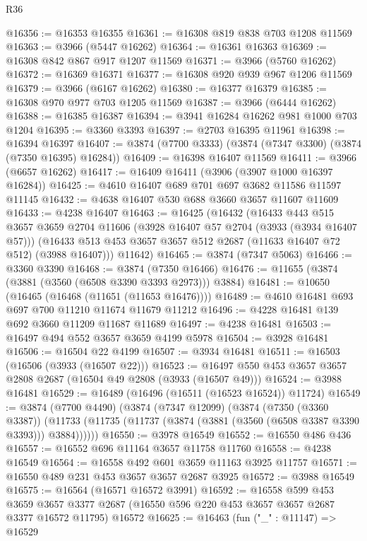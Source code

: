 \begin{lexlean}{R36}
\begin{coremodule}
@16356 := @16353 @16355
@16361 := @16308 @819 @838 @703 @1208 @11569
@16363 := @3966 (@5447 @16262)
@16364 := @16361 @16363
@16369 := @16308 @842 @867 @917 @1207 @11569
@16371 := @3966 (@5760 @16262)
@16372 := @16369 @16371
@16377 := @16308 @920 @939 @967 @1206 @11569
@16379 := @3966 (@6167 @16262)
@16380 := @16377 @16379
@16385 := @16308 @970 @977 @703 @1205 @11569
@16387 := @3966 (@6444 @16262)
@16388 := @16385 @16387
@16394 := @3941 @16284 @16262 @981 @1000 @703 @1204
@16395 := @3360 @3393
@16397 := @2703 @16395 @11961
@16398 := @16394 @16397
@16407 := @3874 (@7700 @3333) (@3874 (@7347 @3300) (@3874 (@7350 @16395) @16284))
@16409 := @16398 @16407 @11569
@16411 := @3966 (@6657 @16262)
@16417 := @16409 @16411 (@3906 (@3907 @1000 @16397 @16284))
@16425 := @4610 @16407 @689 @701 @697 @3682 @11586 @11597 @11145
@16432 := @4638 @16407 @530 @688 @3660 @3657 @11607 @11609
@16433 := @4238 @16407
@16463 := @16425
    (@16432
      (@16433
        @443
        @515
        @3657
        @3659
        @2704
        @11606
        (@3928 @16407 @57 @2704 (@3933 (@3934 @16407 @57)))
        (@16433 @513 @453 @3657 @3657 @512 @2687 (@11633 @16407 @72 @512) (@3988 @16407)))
      @11642)
@16465 := @3874 (@7347 @5063)
@16466 := @3360 @3390
@16468 := @3874 (@7350 @16466)
@16476 := @11655 (@3874 (@3881 (@3560 (@6508 @3390 @3393 @2973))) @3884)
@16481 := @10650 (@16465 (@16468 (@11651 (@11653 @16476))))
@16489 := @4610 @16481 @693 @697 @700 @11210 @11674 @11679 @11212
@16496 := @4228 @16481 @139 @692 @3660 @11209 @11687 @11689
@16497 := @4238 @16481
@16503 := @16497 @494 @552 @3657 @3659 @4199 @5978
@16504 := @3928 @16481
@16506 := @16504 @22 @4199
@16507 := @3934 @16481
@16511 := @16503 (@16506 (@3933 (@16507 @22)))
@16523 := @16497 @550 @453 @3657 @3657 @2808 @2687 (@16504 @49 @2808 (@3933 (@16507 @49)))
@16524 := @3988 @16481
@16529 := @16489 (@16496 (@16511 (@16523 @16524)) @11724)
@16549 := @3874
    (@7700 @4490)
    (@3874
      (@7347 @12099)
      (@3874
        (@7350 (@3360 @3387))
        (@11733 (@11735 (@11737 (@3874 (@3881 (@3560 (@6508 @3387 @3390 @3393))) @3884))))))
@16550 := @3978 @16549
@16552 := @16550 @486 @436
@16557 := @16552 @696 @11164 @3657 @11758 @11760
@16558 := @4238 @16549
@16564 := @16558 @492 @601 @3659 @11163 @3925 @11757
@16571 := @16550 @489 @231 @453 @3657 @3657 @2687 @3925
@16572 := @3988 @16549
@16575 := @16564 (@16571 @16572 @3991)
@16592 := @16558
    @599
    @453
    @3659
    @3657
    @3377
    @2687
    (@16550 @596 @220 @453 @3657 @3657 @2687 @3377 @16572 @11795)
    @16572
@16625 := @16463
    (fun ("_" : @11147) =>
    @16529

\end{coremodule}
\end{lexlean}
